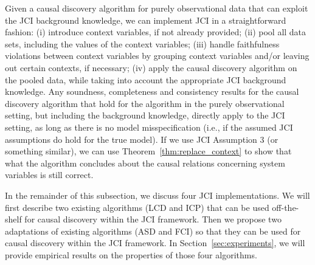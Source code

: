 \documentclass[twoside,11pt]{article}
\begin{document}
Given a causal discovery algorithm for purely observational data that can exploit the JCI background
knowledge, we can implement JCI in a straightforward fashion: (i) introduce
context variables, if not already provided; (ii) pool all data sets, including
the values of the context variables; (iii) handle faithfulness violations between
context variables by grouping context variables and/or leaving out certain contexts,
if necessary; 
(iv) apply the causal discovery algorithm on the pooled data, while taking into account the
appropriate JCI background knowledge. Any soundness, completeness and consistency results for the
causal discovery algorithm that hold for the algorithm in the purely observational setting, but
including the background knowledge, directly apply to the JCI setting, as long as there is no model 
misspecification (i.e., if the assumed JCI assumptions do hold for the true model). 
If we use JCI Assumption 3 (or something similar), we can use Theorem~\ref{thm:replace_context}
to show that what the algorithm concludes about the causal relations concerning system variables
is still correct.

In the remainder of this subsection, we discuss four JCI implementations. We will first describe
two existing algorithms (LCD and ICP) that can be used off-the-shelf for causal discovery 
within the JCI framework. Then we propose two adaptations of existing algorithms (ASD and FCI)
so that they can be used for causal discovery within the JCI framework.
In Section~\ref{sec:experiments}, we will provide empirical results on the properties of those
four algorithms.
\end{document}
